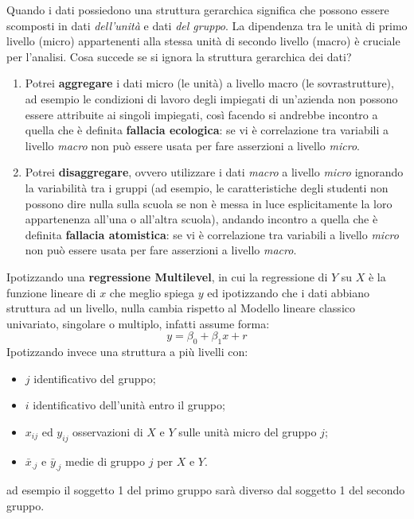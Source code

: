 \documentclass[a4page, 11pt]{article} %
\begin{document}
Quando i dati possiedono una struttura gerarchica significa che possono essere scomposti in dati \textit{dell'unità} e dati \textit{del gruppo}. La dipendenza tra le unità di primo livello (micro) appartenenti alla stessa unità di secondo livello (macro) è cruciale per l’analisi.
\newline
Cosa succede se si ignora la struttura gerarchica dei dati?
\begin{enumerate}[noitemsep]
\item Potrei \textbf{aggregare} i dati micro (le unità) a livello macro (le sovrastrutture), ad esempio le condizioni di lavoro degli impiegati di un'azienda non possono essere attribuite ai singoli impiegati, così facendo si andrebbe incontro a quella che è definita \textbf{fallacia ecologica}: se vi è correlazione tra variabili a livello \textit{macro} non può essere usata per fare asserzioni a livello \textit{micro}.
\item Potrei \textbf{disaggregare}, ovvero utilizzare i dati \textit{macro} a livello \textit{micro} ignorando la variabilità tra i gruppi (ad esempio, le caratteristiche degli studenti non possono dire nulla sulla scuola se non è messa in luce esplicitamente la loro appartenenza all'una o all'altra scuola), andando incontro a quella che è definita \textbf{fallacia atomistica}: se vi è correlazione tra variabili a livello \textit{micro} non può essere usata per fare asserzioni a livello \textit{macro}.
\end{enumerate}
Ipotizzando una \textbf{regressione Multilevel}, in cui la regressione di $Y$ su $X$ è la funzione lineare di $x$ che meglio spiega $y$ ed ipotizzando che i dati abbiano struttura ad un livello, nulla cambia rispetto al Modello lineare classico univariato, singolare o multiplo, infatti assume forma:
\begin{equation*}
y = \beta_0 + \beta_1 x + r
\end{equation*}
Ipotizzando invece una struttura a più livelli con:
\begin{itemize}
\item $j$ identificativo del gruppo;
\item $i$ identificativo dell'unità entro il gruppo;
\item $x_{ij}$ ed $y_{ij}$ osservazioni di $X$ e $Y$ sulle unità micro del gruppo $j$;
\item $\bar{x}_{.j}$ e $\bar{y}_{.j}$ medie di gruppo $j$ per $X$ e $Y$.
\end{itemize}
ad esempio il soggetto 1 del primo gruppo sarà diverso dal soggetto 1 del secondo gruppo. \\
\end{document}
